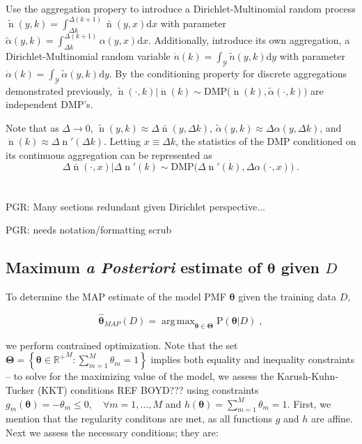 \documentclass[12pt]{report}
\DeclareMathOperator*{\argmax}{arg\,max}
\DeclareMathOperator{\nrm}{\mathrm{n}}
\DeclareMathOperator{\Ycal}{\mathcal{Y}}
\begin{document}
Use the aggregation propery to introduce a Dirichlet-Multinomial random process $\tilde{\nrm}(y,k) = \int_{\Delta k}^{\Delta (k+1)} \bar{\nrm}(y,x) \mathrm{d}x$ with parameter $\tilde{\alpha}(y,k) = \int_{\Delta k}^{\Delta (k+1)} \alpha(y,x) \mathrm{d}x$. Additionally, introduce its own aggregation, a Dirichlet-Multinomial random variable $\dot{n}(k) = \int_{\Ycal} \tilde{n}(y,k) \mathrm{d}y$ with parameter $\dot{\alpha}(k) = \int_{\Ycal} \tilde{\alpha}(y,k) \mathrm{d}y$. By the conditioning property for discrete aggregations demonstrated previously, $\tilde{\nrm}(\cdot,k) | \dot{\nrm}(k) \sim \text{DMP}\big( \dot{\nrm}(k),\tilde{\alpha}(\cdot,k) \big)$ are independent DMP's.

Note that as $\Delta \to 0$, $\tilde{\nrm}(y,k) \approx \Delta \bar{\nrm}(y,\Delta k)$, $\tilde{\alpha}(y,k) \approx \Delta \alpha(y,\Delta k)$, and $\dot{\nrm}(k) \approx \Delta \nrm'(\Delta k)$. Letting $x \equiv \Delta k$, the statistics of the DMP conditioned on its continuous aggregation can be represented as
\begin{equation}
\Delta \bar{\nrm}(\cdot,x) | \Delta \nrm'(k) \sim \text{DMP}\big( \Delta \nrm'(k), \Delta \alpha(\cdot,x) \big) \;.
\end{equation}







\chapter{}


PGR: Many sections redundant given Dirichlet perspective...

PGR: needs notation/formatting scrub






\section{Maximum \emph{a Posteriori} estimate of $\bm{\theta}$ given $D$} \label{app:MAP_theta}

To determine the MAP estimate of the model PMF $\bm{\theta}$ given the training data $D$, 

\begin{equation}
\hat{\bm{\theta}}_{MAP}(D) = \argmax_{\bm{\theta} \in \bm{\Theta}} \text{P}(\bm{\theta} | D) \;,
\end{equation}

we perform contrained optimization. Note that the set $\bm{\Theta} = \left\{ \bm{\theta} \in {\mathbb{R}^+}^{M}: \sum_{m=1}^{M} \theta_m = 1 \right\}$ implies both equality and inequality constraints -- to solve for the maximizing value of the model, we assess the Karush-Kuhn-Tucker (KKT) conditions REF BOYD??? using constraints $g_m(\bm{\theta}) = -\theta_m \leq 0, \quad \forall m = 1,\ldots,M$ and $h(\bm{\theta}) = \sum_{m=1}^M \theta_m = 1$. First, we mention that the regularity conditons are met, as all functions $g$ and $h$ are affine. Next we assess the necessary conditions; they are:
\end{document}
